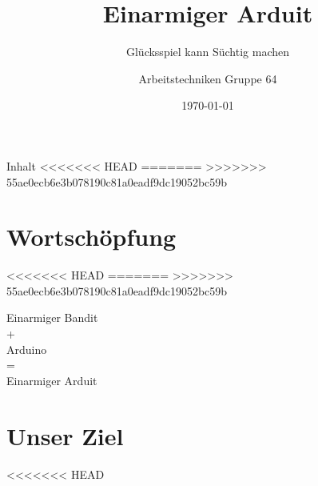 \documentclass[mathserif,9pt]{article}
\title[Einarmiger Arduit]{Einarmiger Arduit}
\subtitle{Glücksspiel kann Süchtig machen}
\author{Arbeitstechniken Gruppe 64}
\institute{Franziska Massmann \; Jonas Nikolić \; Lukas Pensler \; Simon Struck}
\date{\today}
\begin{document}
    \titleframe        %

    \begin{frame}{Inhalt}
<<<<<<< HEAD
        \tableofcontents
=======
        \tableofcontents{}
>>>>>>> 55ae0ecb6e3b078190c81a0eadf9dc19052bc59b
    \end{frame}

    \section{Wortschöpfung}
    \begin{frame}{}
<<<<<<< HEAD
=======
>>>>>>> 55ae0ecb6e3b078190c81a0eadf9dc19052bc59b
        \begin{block}{}
            \centering
            \Huge{
            Einarmiger Bandit \\
            + \\
            Arduino \\
            = \\
            Einarmiger Arduit}
        \end{block}
    \end{frame}

    \section{Unser Ziel}
<<<<<<< HEAD
    
\end{document}
